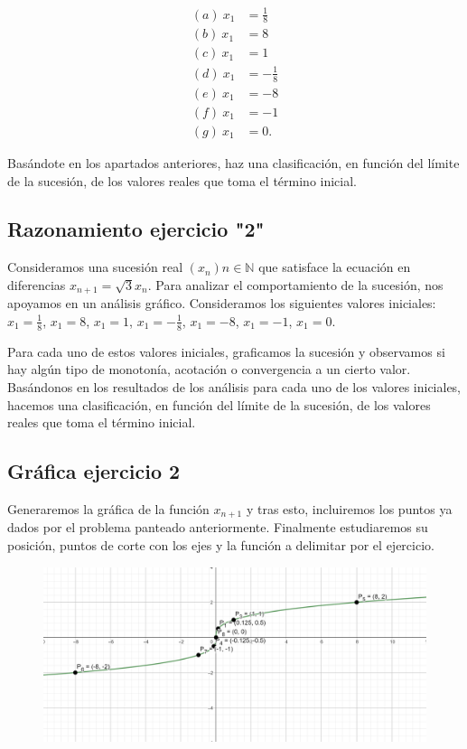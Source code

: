 \documentclass{article}
\begin{document}
\begin{align*}
(a) \ x_1 &= \frac{1}{8} \\
(b) \ x_1 &= 8 \\
(c) \ x_1 &= 1 \\
(d) \ x_1 &= -\frac{1}{8} \\
(e) \ x_1 &= -8 \\
(f) \ x_1 &= -1 \\
(g) \ x_1 &= 0.
\end{align*}

Basándote en los apartados anteriores, haz una clasificación, en función del límite de la sucesión, de los valores reales que toma el término inicial.

\subsection{Razonamiento ejercicio "2"}

Consideramos una sucesión real $(x_n){n \in \mathbb{N}}$ que satisface la ecuación en diferencias $x_{n + 1} = \sqrt{3}x_n$. Para analizar el comportamiento de la sucesión, nos apoyamos en un análisis gráfico. Consideramos los siguientes valores iniciales: $x_1 = \frac{1}{8}$, $x_1 = 8$, $x_1 = 1$, $x_1 = -\frac{1}{8}$, $x_1 = -8$, $x_1 = -1$, $x_1 = 0$.

Para cada uno de estos valores iniciales, graficamos la sucesión y observamos si hay algún tipo de monotonía, acotación o convergencia a un cierto valor. Basándonos en los resultados de los análisis para cada uno de los valores iniciales, hacemos una clasificación, en función del límite de la sucesión, de los valores reales que toma el término inicial.

\subsection{Gráfica ejercicio 2}

Generaremos la gráfica de la función $x_{n+1}$ y tras esto, incluiremos los puntos ya dados por el problema panteado anteriormente. Finalmente estudiaremos su posición, puntos de corte con los ejes y la función a delimitar por el ejercicio. 

\begin{figure}[t]
    \centerline{\includegraphics{graficaboletin.png}}
\end{figure}
\end{document}
